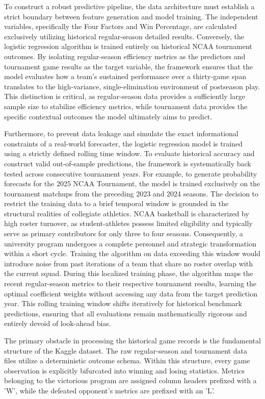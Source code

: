 \documentclass[12pt,leqno]{article}\usepackage[pdftex]{graphicx}\usepackage[usenames,dvipsnames]{xcolor}
\theoremstyle{remark}
\begin{document}
To construct a robust predictive pipeline, the data architecture must establish a strict boundary between feature generation and model training. The independent variables, specifically the Four Factors and Win Percentage, are calculated exclusively utilizing historical regular-season detailed results. Conversely, the logistic regression algorithm is trained entirely on historical NCAA tournament outcomes. By isolating regular-season efficiency metrics as the predictors and tournament game results as the target variable, the framework ensures that the model evaluates how a team's sustained performance over a thirty-game span translates to the high-variance, single-elimination environment of postseason play. This distinction is critical, as regular-season data provides a sufficiently large sample size to stabilize efficiency metrics, while tournament data provides the specific contextual outcomes the model ultimately aims to predict.

Furthermore, to prevent data leakage and simulate the exact informational constraints of a real-world forecaster, the logistic regression model is trained using a strictly defined rolling time window. To evaluate historical accuracy and construct valid out-of-sample predictions, the framework is systematically back tested across consecutive tournament years. For example, to generate probability forecasts for the 2025 NCAA Tournament, the model is trained exclusively on the tournament matchups from the preceding 2023 and 2024 seasons. The decision to restrict the training data to a brief temporal window is grounded in the structural realities of collegiate athletics. NCAA basketball is characterized by high roster turnover, as student-athletes possess limited eligibility and typically serve as primary contributors for only three to four seasons. Consequently, a university program undergoes a complete personnel and strategic transformation within a short cycle. Training the algorithm on data exceeding this window would introduce noise from past iterations of a team that share no roster overlap with the current squad. During this localized training phase, the algorithm maps the recent regular-season metrics to their respective tournament results, learning the optimal coefficient weights without accessing any data from the target prediction year. This rolling training window shifts iteratively for historical benchmark predictions, ensuring that all evaluations remain mathematically rigorous and entirely devoid of look-ahead bias.

The primary obstacle in processing the historical game records is the fundamental structure of the Kaggle dataset. The raw regular-season and tournament data files utilize a deterministic outcome schema. Within this structure, every game observation is explicitly bifurcated into winning and losing statistics. Metrics belonging to the victorious program are assigned column headers prefixed with a 'W', while the defeated opponent's metrics are prefixed with an 'L'.
\end{document}
